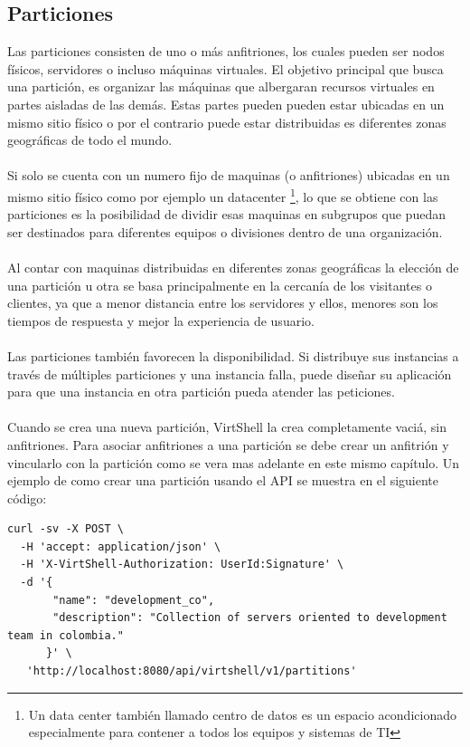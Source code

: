 \subsection{Particiones}
Las particiones consisten de uno o más anfitriones, los cuales pueden ser nodos físicos, servidores o incluso máquinas virtuales. El objetivo principal que busca una partición, es organizar las máquinas que albergaran recursos virtuales en partes aisladas de las demás. Estas partes pueden pueden estar ubicadas en un mismo sitio físico o por el contrario puede estar distribuidas es diferentes zonas geográficas de todo el mundo.\\
\\
Si solo se cuenta con un numero fijo de maquinas (o anfitriones) ubicadas en un mismo sitio físico como por ejemplo un datacenter \footnote{Un data center también llamado centro de datos es un espacio acondicionado especialmente para contener a todos los equipos y sistemas de TI}, lo que se obtiene con las particiones es la posibilidad de dividir esas maquinas en subgrupos que puedan ser destinados para diferentes equipos o divisiones dentro de una organización.\\ 
\\
Al contar con maquinas distribuidas en diferentes zonas geográficas la elección de una partición u otra se basa principalmente en la cercanía de los visitantes o clientes, ya que a menor distancia entre los servidores y ellos, menores son los tiempos de respuesta y mejor la experiencia de usuario.\\
\\
Las particiones también favorecen la disponibilidad. Si distribuye sus instancias a través de múltiples particiones y una instancia falla, puede diseñar su aplicación para que una instancia en otra partición pueda atender las peticiones.\\
\\
Cuando se crea una nueva partición, VirtShell la crea completamente vaciá, sin anfitriones. Para asociar anfitriones a una partición se debe crear un anfitrión y vincularlo con la partición como se vera mas adelante en este mismo capítulo. Un ejemplo de como crear una partición usando el API se muestra en el siguiente código:

\begin{lstlisting}[style=json, caption=Petición HTTP para crear una partición]
curl -sv -X POST \
  -H 'accept: application/json' \
  -H 'X-VirtShell-Authorization: UserId:Signature' \
  -d '{
       "name": "development_co",
       "description": "Collection of servers oriented to development team in colombia."
      }' \
   'http://localhost:8080/api/virtshell/v1/partitions'
\end{lstlisting}


